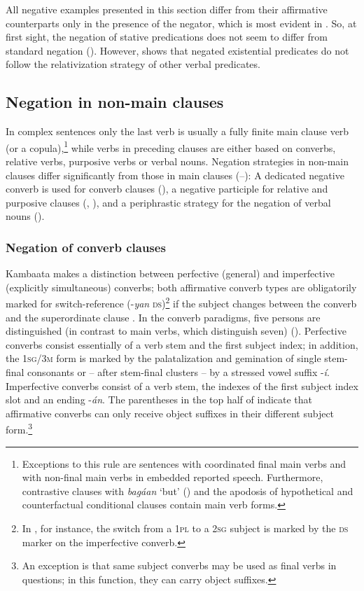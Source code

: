 \documentclass[output=paper,colorlinks,citecolor=brown,draftmode
]{langscibook}
\begin{document}
All negative examples presented in this section differ from their affirmative counterparts only in the presence of the negator, which is most evident in .
So, at first sight, the negation of stative predications does not seem to differ from standard negation (). However,   shows that negated existential predicates do not follow the relativization strategy of other verbal predicates.

\subsection{Negation in non-main clauses}\label{sec:treis:2.4}

In complex sentences only the last verb is usually a fully finite main clause verb (or a copula),\footnote{Exceptions to this rule are sentences with coordinated final main verbs and with non-final main verbs in embedded reported speech. Furthermore, contrastive clauses with \textit{bagáan} ‘but’ () and the apodosis of hypothetical and counterfactual conditional clauses contain main verb forms.}  while verbs in preceding clauses are either based on converbs, relative verbs, purposive verbs or verbal nouns. Negation strategies in non-main clauses differ significantly from those in main clauses (--): A dedicated negative converb is used for converb clauses (), a negative participle for relative and purposive clauses (, ), and a periphrastic strategy for the negation of verbal nouns ().

\subsubsection{Negation of converb clauses}\label{sec:treis:2.4.1}

Kambaata makes a distinction between perfective (general) and imperfective (explicitly simultaneous) converbs; both affirmative converb types are obligatorily marked for switch-reference (-\textit{yan} \textsc{ds})\footnote{In , for instance, the switch from a \textsc{1pl} to a \textsc{2sg} subject is marked by the \textsc{ds} marker on the imperfective converb.}  if the subject changes between the converb and the superordinate clause \citep{Treis2012c}. In the converb paradigms, five persons are distinguished (in contrast to main verbs, which distinguish seven) (). Perfective converbs consist essentially of a verb stem and the first subject index; in addition, the \textsc{1sg/3m} form is marked by the palatalization and gemination of single stem-final consonants or – after stem-final clusters – by a stressed vowel suffix -\textit{í}. Imperfective converbs consist of a verb stem, the indexes of the first subject index slot and an ending -\textit{án}. The parentheses in the top half of  indicate that affirmative converbs can only receive object suffixes in their different subject form.\footnote{An exception is that same subject converbs may be used as final verbs in questions; in this function, they can carry object suffixes.} 
\end{document}
